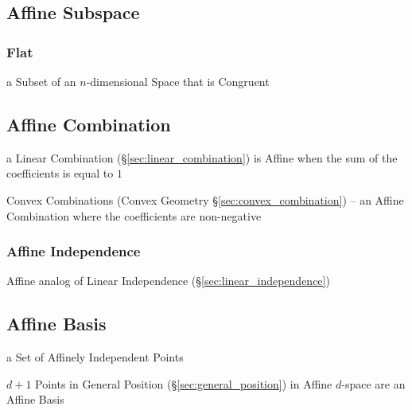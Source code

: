 \subsection{Affine Subspace}\label{sec:affine_subspace}

\subsubsection{Flat}\label{sec:flat}

a Subset of an $n$-dimensional Space that is Congruent



\subsection{Affine Combination}\label{sec:affine_combination}

a Linear Combination (\S\ref{sec:linear_combination}) is Affine when the sum of
the coefficients is equal to $1$

\fist Convex Combinations (Convex Geometry \S\ref{sec:convex_combination}) -- an
Affine Combination where the coefficients are non-negative



\subsubsection{Affine Independence}\label{sec:affine_independence}

Affine analog of Linear Independence (\S\ref{sec:linear_independence})



\subsection{Affine Basis}\label{sec:affine_basis}

a Set of Affinely Independent Points

$d+1$ Points in General Position (\S\ref{sec:general_position}) in Affine
$d$-space are an Affine Basis



